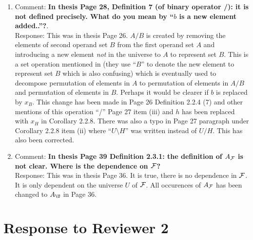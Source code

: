 \documentclass{article}
\begin{document}
\begin{enumerate}
\item Comment: {\bf In thesis Page 28, Definition 7 (of binary
    operator /): it is not defined precisely. What do you mean by
    ``$b$ is a new element added..''?}.\\
Response: This was in thesis Page 26. $A/B$ is created by removing the elements of second operand set $B$ from
the first operand set $A$ and introducing a new element {\em not} in the
universe to $A$ to represent set $B$. This is a set operation 
mentioned in \cite{mm96} (they use ``$B$'' to denote the new element to represent
set $B$ which is also confusing) which is eventually used to decompose
permutation of elements in $A$ to permutation of elements in $A/B$ and
permutation of elements in $B$.
Perhaps it would be clearer if
$b$ is replaced by $x_B$. This change has been made in Page 26
Definition 2.2.4 (7) and other mentions of this operation ``/'' Page
27 item (iii) and $h$ has been replaced with $x_H$ in Corollary
2.2.8. There was also a typo in Page 27 paragraph under Corollary
2.2.8 item (ii) where ``$U \setminus H$'' was written instead of $U / H$.
This has also been corrected.

\item Comment: {\bf In thesis Page 39 Definition 2.3.1: the definition
  of $A_{\cal F}$ is not clear. Where is the dependence on ${\cal F}$?}\\
Response: This was in thesis Page 36. It is true, there is no
dependence in ${\cal F}$. It is only dependent on the universe $U$ of
${\cal F}$. All occurences of $A_{\cal F}$ has been changed to $A_\U$ in Page 36.
\end{enumerate}



\section{Response to Reviewer 2}


%
\end{document}
